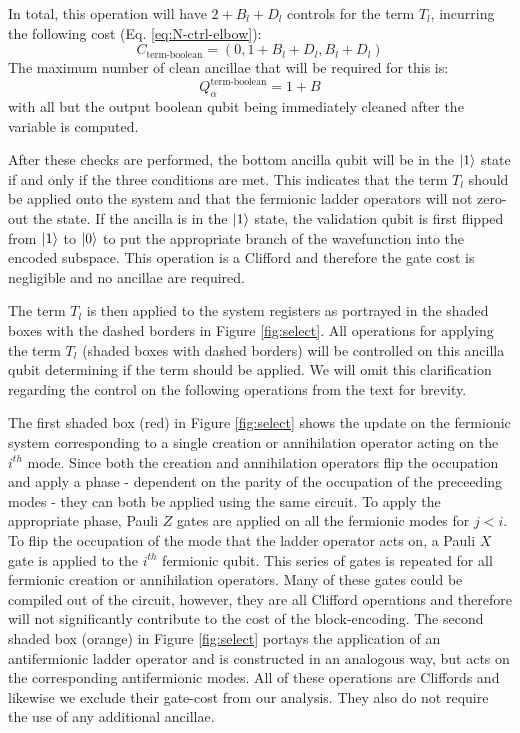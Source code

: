 In total, this operation will have $2 + B_l + D_l$ controls for the term $T_l$, incurring the following cost (Eq. \ref{eq:N-ctrl-elbow}):
\begin{equation}
    C_{\text{term-boolean}} = (0, 1 + B_l + D_l, B_l + D_l)
\end{equation}
The maximum number of clean ancillae that will be required for this is:
\begin{equation}
    Q_\alpha^{\text{term-boolean}} = 1 + B
\end{equation}
with all but the output boolean qubit being immediately cleaned after the variable is computed.

After these checks are performed, the bottom ancilla qubit will be in the $\ket{1}$ state if and only if the three conditions are met.
This indicates that the term $T_l$ should be applied onto the system and that the fermionic ladder operators will not zero-out the state.
If the ancilla is in the $\ket{1}$ state, the validation qubit is first flipped from $\ket{1}$ to $\ket{0}$ to put the appropriate branch of the wavefunction into the encoded subspace.
This operation is a Clifford and therefore the gate cost is negligible and no ancillae are required.

The term $T_l$ is then applied to the system registers as portrayed in the shaded boxes with the dashed borders in Figure \ref{fig:select}.
All operations for applying the term $T_l$ (shaded boxes with dashed borders) will be controlled on this ancilla qubit determining if the term should be applied.
We will omit this clarification regarding the control on the following operations from the text for brevity.

The first shaded box (red) in Figure \ref{fig:select} shows the update on the fermionic system corresponding to a single creation or annihilation operator acting on the $i^{th}$ mode.
Since both the creation and annihilation operators flip the occupation and apply a phase - dependent on the parity of the occupation of the preceeding modes - they can both be applied using the same circuit.
To apply the appropriate phase, Pauli $Z$ gates are applied on all the fermionic modes for $j < i$.
To flip the occupation of the mode that the ladder operator acts on, a Pauli $X$ gate is applied to the $i^{th}$ fermionic qubit.
This series of gates is repeated for all fermionic creation or annihilation operators.
Many of these gates could be compiled out of the circuit, however, they are all Clifford operations and therefore will not significantly contribute to the cost of the block-encoding.
The second shaded box (orange) in Figure \ref{fig:select} portays the application of an antifermionic ladder operator and is constructed in an analogous way, but acts on the corresponding antifermionic modes.
All of these operations are Cliffords and likewise we exclude their gate-cost from our analysis.
They also do not require the use of any additional ancillae.

